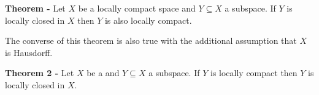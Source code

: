 \documentclass[12pt]{article}
\begin{document}
{\bf Theorem - } Let $X$ be a locally compact space and $Y \subseteq X$ a subspace. If $Y$ is locally closed in $X$ then $Y$ is also locally compact.


The converse of this theorem is also true with the additional assumption that $X$ is Hausdorff.

{\bf Theorem 2 -} Let $X$ be a  and $Y \subseteq X$ a subspace. If $Y$ is locally compact then $Y$ is locally closed in $X$.
\end{document}
